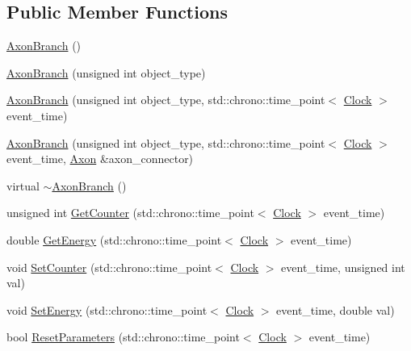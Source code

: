 \subsection*{Public Member Functions}
\begin{DoxyCompactItemize}
\item 
\mbox{\hyperlink{classAxonBranch_a5bb6ccef8d94c937a85148af932221c0}{Axon\+Branch}} ()
\item 
\mbox{\hyperlink{classAxonBranch_a67618605ac3731556ab48a6583e21ba8}{Axon\+Branch}} (unsigned int object\+\_\+type)
\item 
\mbox{\hyperlink{classAxonBranch_ad6191fcfd8bedc058a4f1cfb5056f5b2}{Axon\+Branch}} (unsigned int object\+\_\+type, std\+::chrono\+::time\+\_\+point$<$ \mbox{\hyperlink{universe_8h_a0ef8d951d1ca5ab3cfaf7ab4c7a6fd80}{Clock}} $>$ event\+\_\+time)
\item 
\mbox{\hyperlink{classAxonBranch_a98f33462edf82dacab750d1140172912}{Axon\+Branch}} (unsigned int object\+\_\+type, std\+::chrono\+::time\+\_\+point$<$ \mbox{\hyperlink{universe_8h_a0ef8d951d1ca5ab3cfaf7ab4c7a6fd80}{Clock}} $>$ event\+\_\+time, \mbox{\hyperlink{classAxon}{Axon}} \&axon\+\_\+connector)
\item 
virtual \mbox{\hyperlink{classAxonBranch_ae4ef4c954b43d084cafb30cf900a1728}{$\sim$\+Axon\+Branch}} ()
\item 
unsigned int \mbox{\hyperlink{classAxonBranch_a1d2404b68ec2d18a814c96a7c04c5fc4}{Get\+Counter}} (std\+::chrono\+::time\+\_\+point$<$ \mbox{\hyperlink{universe_8h_a0ef8d951d1ca5ab3cfaf7ab4c7a6fd80}{Clock}} $>$ event\+\_\+time)
\item 
double \mbox{\hyperlink{classAxonBranch_a688ec51cd5116e9aebe9b4d3c5c7f2b1}{Get\+Energy}} (std\+::chrono\+::time\+\_\+point$<$ \mbox{\hyperlink{universe_8h_a0ef8d951d1ca5ab3cfaf7ab4c7a6fd80}{Clock}} $>$ event\+\_\+time)
\item 
void \mbox{\hyperlink{classAxonBranch_a96ba30b18627563d637d4e02fac943be}{Set\+Counter}} (std\+::chrono\+::time\+\_\+point$<$ \mbox{\hyperlink{universe_8h_a0ef8d951d1ca5ab3cfaf7ab4c7a6fd80}{Clock}} $>$ event\+\_\+time, unsigned int val)
\item 
void \mbox{\hyperlink{classAxonBranch_a6918dcaf6d9325a1a22a2e6c65ad5dab}{Set\+Energy}} (std\+::chrono\+::time\+\_\+point$<$ \mbox{\hyperlink{universe_8h_a0ef8d951d1ca5ab3cfaf7ab4c7a6fd80}{Clock}} $>$ event\+\_\+time, double val)
\item 
bool \mbox{\hyperlink{classAxonBranch_a195d68dffd37317db3f94e1b4c8f73c7}{Reset\+Parameters}} (std\+::chrono\+::time\+\_\+point$<$ \mbox{\hyperlink{universe_8h_a0ef8d951d1ca5ab3cfaf7ab4c7a6fd80}{Clock}} $>$ event\+\_\+time)

\end{DoxyCompactItemize}
